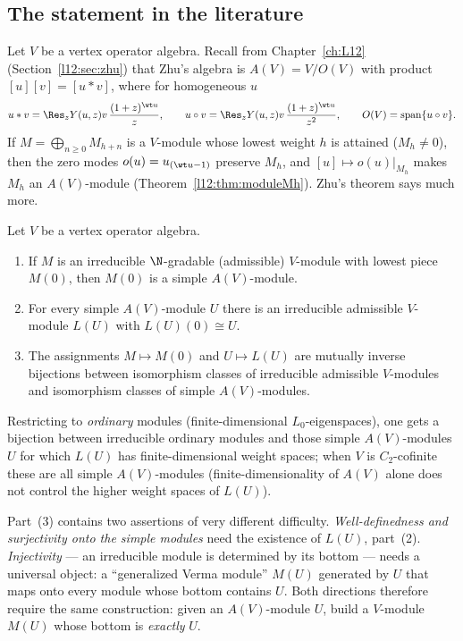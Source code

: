 \subsection{The statement in the literature}

Let $V$ be a vertex operator algebra. Recall from Chapter~\ref{ch:L12} (Section~\ref{l12:sec:zhu}) that Zhu's algebra is
$A(V) = V/O(V)$ with product $[u][v] = [u*v]$, where for homogeneous $u$
\begin{equation*}
 u*v = \Res_z Y(u,z)v\,\frac{(1+z)^{\wt u}}{z},\qquad u\circ v = \Res_z Y(u,z)v\,\frac{(1+z)^{\wt u}}{z^{2}},
 \qquad O(V) = \operatorname{span}\{u\circ v\}.
\end{equation*}
If $M = \bigoplus_{n\ge0}M_{h+n}$ is a $V$-module whose lowest weight $h$ is attained ($M_h\neq0$), then the zero modes
$o(u) = u_{(\wt u-1)}$ preserve $M_h$, and $[u]\mapsto o(u)|_{M_h}$ makes $M_h$ an $A(V)$-module
(Theorem~\ref{l12:thm:moduleMh}). Zhu's theorem says much more.

\begin{theorem}\label{l13:thm:zhu-lit}
Let $V$ be a vertex operator algebra.
\begin{enumerate}
\item If $M$ is an irreducible $\N$-gradable (admissible) $V$-module with lowest piece $M(0)$, then $M(0)$ is a simple
  $A(V)$-module.
\item For every simple $A(V)$-module $U$ there is an irreducible admissible $V$-module $L(U)$ with $L(U)(0)\cong U$.
\item The assignments $M\mapsto M(0)$ and $U\mapsto L(U)$ are mutually inverse bijections between isomorphism classes
  of irreducible admissible $V$-modules and isomorphism classes of simple $A(V)$-modules.
\end{enumerate}
\end{theorem}
Restricting to \emph{ordinary} modules (finite-dimensional $L_0$-eigenspaces), one gets a bijection between irreducible
ordinary modules and those simple $A(V)$-modules $U$ for which $L(U)$ has finite-dimensional weight spaces; when $V$
is $C_2$-cofinite these are all simple $A(V)$-modules (finite-dimensionality of $A(V)$ alone does not control the higher
weight spaces of $L(U)$).

Part~(3) contains two assertions of very different difficulty. \emph{Well-definedness and surjectivity onto the simple
modules} need the existence of $L(U)$, part~(2). \emph{Injectivity} --- an irreducible module is determined by its
bottom --- needs a universal object: a ``generalized Verma module'' $M(U)$ generated by $U$ that maps onto every module
whose bottom contains $U$. Both directions therefore require the same construction: given an $A(V)$-module $U$, build a
$V$-module $M(U)$ whose bottom is \emph{exactly} $U$.

